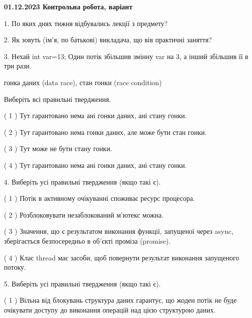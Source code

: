 \documentclass[12pt, ukrainian]{article}
\begin{document}
\vspace{4mm}
\newpage
\begin {large}

\textbf{01.12.2023 Контрольна робота, варіант  }\par


{
1. По яких днях тижня відбувались лекції з предмету?



\vspace{5mm}
2. Як зовуть (ім'я, по батькові) викладача, що вів практичні заняття?



\vspace{5mm}
3. Нехай int var=13; Один потік збільшив змінну var на 3, а інший збільшив її в три рази.

гонка даних (data race), стан гонки (race condition)

Виберіть всі правильні твердження.\par
\vspace{2mm}
( 1 ) Тут гарантовано нема ані гонки даних, ані стану гонки.%

( 2 ) Тут гарантовано нема гонки даних, але може бути стан гонки.%

( 3 ) Тут може не бути стану гонки.%

( 4 ) Тут гарантовано нема ані гонки даних, ані стану гонки.%


\vspace{5mm}
4. Виберіть усі правильні твердження (якщо такі є).\par
\vspace{2mm}

( 1 ) Потік в активному очікуванні споживає ресурс процесора.%

( 2 ) Розблоковувати незаблокований м’ютекс можна.%

( 3 ) Значення, що є результатом виконання функції, запущеної через async, зберігається безпосередньо в об’єкті проміза (promise).%

( 4 ) Клас thread має засоби, щоб повернути результат виконання запущеного потоку.%


\vspace{5mm}
5. Виберіть усі правильні твердження (якщо такі є).\par
\vspace{2mm}

( 1 ) Вільна від блокувань структура даних гарантує, що жоден потік не буде очікувати доступу до виконання операцій над цією структурою даних.%

}
\end{large}
\end{document}
